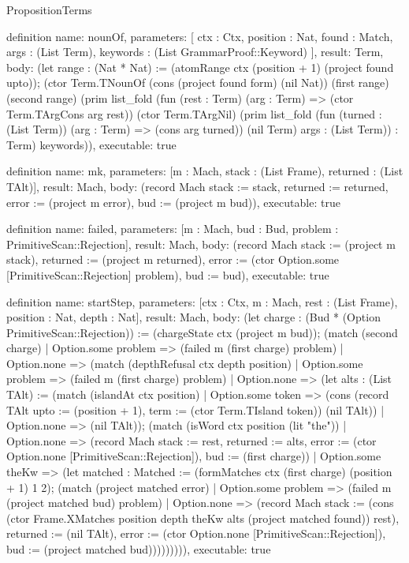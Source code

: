 \begin{lexlean}{PropositionTerms}
\begin{semanticmodule}
definition{
  name: nounOf,
  parameters: [
    ctx : Ctx,
    position : Nat,
    found : Match,
    args : (List Term),
    keywords : (List GrammarProof::Keyword)
  ],
  result: Term,
  body: (let range : (Nat * Nat) := (atomRange ctx (position + 1) (project found upto)); (ctor Term.TNounOf (cons (project found form) (nil Nat)) (first range) (second range) (prim list_fold (fun (rest : Term) (arg : Term) => (ctor Term.TArgCons arg rest)) (ctor Term.TArgNil) (prim list_fold (fun (turned : (List Term)) (arg : Term) => (cons arg turned)) (nil Term) args : (List Term)) : Term) keywords)),
  executable: true
}

definition{
  name: mk,
  parameters: [m : Mach, stack : (List Frame), returned : (List TAlt)],
  result: Mach,
  body: (record Mach {stack := stack, returned := returned, error := (project m error), bud := (project m bud)}),
  executable: true
}

definition{
  name: failed,
  parameters: [m : Mach, bud : Bud, problem : PrimitiveScan::Rejection],
  result: Mach,
  body: (record Mach {stack := (project m stack), returned := (project m returned), error := (ctor Option.some [PrimitiveScan::Rejection] problem), bud := bud}),
  executable: true
}

definition{
  name: startStep,
  parameters: [ctx : Ctx, m : Mach, rest : (List Frame), position : Nat, depth : Nat],
  result: Mach,
  body: (let charge : (Bud * (Option PrimitiveScan::Rejection)) := (chargeState ctx (project m bud)); (match (second charge)
    | Option.some problem => (failed m (first charge) problem)
    | Option.none => (match (depthRefusal ctx depth position)
      | Option.some problem => (failed m (first charge) problem)
      | Option.none => (let alts : (List TAlt) := (match (islandAt ctx position)
        | Option.some token => (cons (record TAlt {upto := (position + 1), term := (ctor Term.TIsland token)}) (nil TAlt))
        | Option.none => (nil TAlt)); (match (isWord ctx position (lit "the"))
        | Option.none => (record Mach {stack := rest, returned := alts, error := (ctor Option.none [PrimitiveScan::Rejection]), bud := (first charge)})
        | Option.some theKw => (let matched : Matched := (formMatches ctx (first charge) (position + 1) 1 2); (match (project matched error)
          | Option.some problem => (failed m (project matched bud) problem)
          | Option.none => (record Mach {stack := (cons (ctor Frame.XMatches position depth theKw alts (project matched found)) rest), returned := (nil TAlt), error := (ctor Option.none [PrimitiveScan::Rejection]), bud := (project matched bud)})))))))),
  executable: true
}


\end{semanticmodule}
\end{lexlean}
